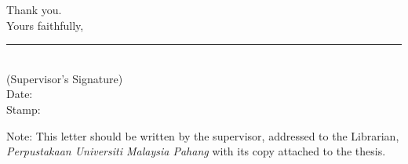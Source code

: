 \begin{onehalfspacing}
\begin{flushleft}
Thank you.\\

Yours faithfully,\\
\vspace{2cm}
\noindent\rule{5cm}{0.4pt}\\
(Supervisor's Signature)\\

Date:\\
Stamp:\\

\end{flushleft}
Note: This letter should be written by the supervisor, addressed to the Librarian, \textit{Perpustakaan Universiti Malaysia Pahang} with its copy attached to the thesis.
\end{onehalfspacing}